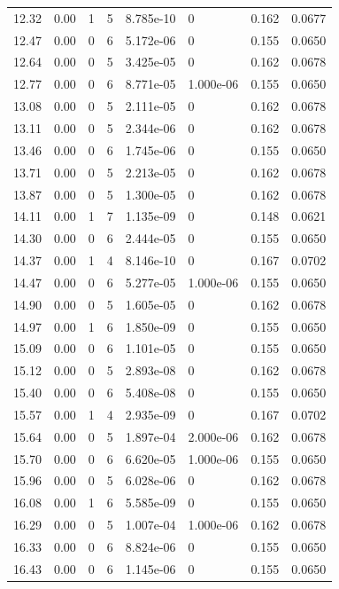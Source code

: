 \documentclass[preview]{standalone}
\begin{document}
{{{\begin{tabular}{L{1.2cm}C{1.2cm} C{0.3cm}C{0.5cm} C{1.4cm}C{1.4cm} C{1.4cm}C{1.4cm}}
  12.32  &  0.00  & 1     &  5 &  8.785e-10  & 0  & 0.162 &  0.0677   \\ 
  12.47  &  0.00  & 0     &  6 &  5.172e-06  & 0  & 0.155 &  0.0650   \\ 
  12.64  &  0.00  & 0     &  5 &  3.425e-05  & 0  & 0.162 &  0.0678   \\ 
  12.77  &  0.00  & 0     &  6 &  8.771e-05  & 1.000e-06  & 0.155 &  0.0650   \\ 
  13.08  &  0.00  & 0     &  5 &  2.111e-05  & 0  & 0.162 &  0.0678   \\ 
  13.11  &  0.00  & 0     &  5 &  2.344e-06  & 0  & 0.162 &  0.0678   \\ 
  13.46  &  0.00  & 0     &  6 &  1.745e-06  & 0  & 0.155 &  0.0650   \\ 
  13.71  &  0.00  & 0     &  5 &  2.213e-05  & 0  & 0.162 &  0.0678   \\ 
  13.87  &  0.00  & 0     &  5 &  1.300e-05  & 0  & 0.162 &  0.0678   \\ 
  14.11  &  0.00  & 1     &  7 &  1.135e-09  & 0  & 0.148 &  0.0621   \\ 
  14.30  &  0.00  & 0     &  6 &  2.444e-05  & 0  & 0.155 &  0.0650   \\ 
  14.37  &  0.00  & 1     &  4 &  8.146e-10  & 0  & 0.167 &  0.0702   \\ 
  14.47  &  0.00  & 0     &  6 &  5.277e-05  & 1.000e-06  & 0.155 &  0.0650   \\ 
  14.90  &  0.00  & 0     &  5 &  1.605e-05  & 0  & 0.162 &  0.0678   \\ 
  14.97  &  0.00  & 1     &  6 &  1.850e-09  & 0  & 0.155 &  0.0650   \\ 
  15.09  &  0.00  & 0     &  6 &  1.101e-05  & 0  & 0.155 &  0.0650   \\ 
  15.12  &  0.00  & 0     &  5 &  2.893e-08  & 0  & 0.162 &  0.0678   \\ 
  15.40  &  0.00  & 0     &  6 &  5.408e-08  & 0  & 0.155 &  0.0650   \\ 
  15.57  &  0.00  & 1     &  4 &  2.935e-09  & 0  & 0.167 &  0.0702   \\ 
  15.64  &  0.00  & 0     &  5 &  1.897e-04  & 2.000e-06  & 0.162 &  0.0678   \\ 
  15.70  &  0.00  & 0     &  6 &  6.620e-05  & 1.000e-06  & 0.155 &  0.0650   \\ 
  15.96  &  0.00  & 0     &  5 &  6.028e-06  & 0  & 0.162 &  0.0678   \\ 
  16.08  &  0.00  & 1     &  6 &  5.585e-09  & 0  & 0.155 &  0.0650   \\ 
  16.29  &  0.00  & 0     &  5 &  1.007e-04  & 1.000e-06  & 0.162 &  0.0678   \\ 
  16.33  &  0.00  & 0     &  6 &  8.824e-06  & 0  & 0.155 &  0.0650   \\ 
  16.43  &  0.00  & 0     &  6 &  1.145e-06  & 0  & 0.155 &  0.0650   \\ 
\hline 
\end{tabular} 

}}}
\end{document}
